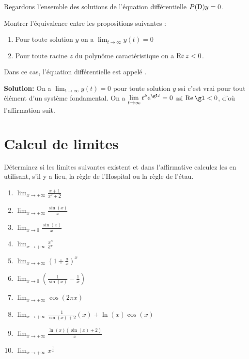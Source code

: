 \bigskip
\exerNico
Regardons l'ensemble des solutions de l'équation différentielle $P({\rm D})y =0$.

Montrer l'équivalence entre les propositions suivantes :
\begin{enumerate}

	\item
	      Pour toute solution $y$ on a $\displaystyle \lim_{t \to \infty} y(t) = 0$

	\item
	      Pour toute racine $z$ du polynôme caractéristique on a ${\rm Re}\, z <0$.

\end{enumerate}
Dans ce cas, l'équation différentielle est appelé  .

\bigskip
{\bf Solution:}
On a
$\displaystyle \lim_{t \to \infty} y(t) = 0$ pour toute solution $y$ ssi c'est vrai pour tout élément d'un système fondamental.
On a $\displaystyle \lim_{t \to \infty} t^k {\rm e}^{\gl t}=0$ ssi ${\rm Re }\,\gl <0$,
d'où l'affirmation suit.






\section{Calcul de limites}

\exerNico Déterminez si les limites suivantes existent et dans
l'affirmative calculez les en utilisant, s'il y a lieu, la règle de
l'Hospital ou la règle de l'étau.
\begin{enumerate}
	\item $  \lim_{x \rightarrow  +\infty} \frac{x+1}{x^2+2} $
	\item $  \lim_{x \rightarrow  +\infty} \frac{\sin(x)}{x} $
	\item $  \lim_{x \rightarrow  0} \frac{\sin(x)}{x} $
	\item $  \lim_{x \rightarrow  +\infty}  \frac{x ^n}{e ^x} $
	\item $  \lim_{x \rightarrow  +\infty} (1 + \frac{a}{x})^x $
	\item $  \lim_{x \rightarrow  0} (\frac{1}{\sin(x)} - \frac{1}{x} )$
	\item $  \lim_{x \rightarrow  +\infty} \cos( 2 \pi x) $
	\item $  \lim_{x \rightarrow  +\infty} \frac{1}{\sin(x)+2}(x) +\ln(x)\cos(x) $
	\item $  \lim_{x \rightarrow  +\infty} \frac{ \ln(x)(\sin(x) +2)}{x} $
	\item $  \lim_{x \rightarrow  +\infty} x ^\frac{1}{x} $
\end{enumerate}

